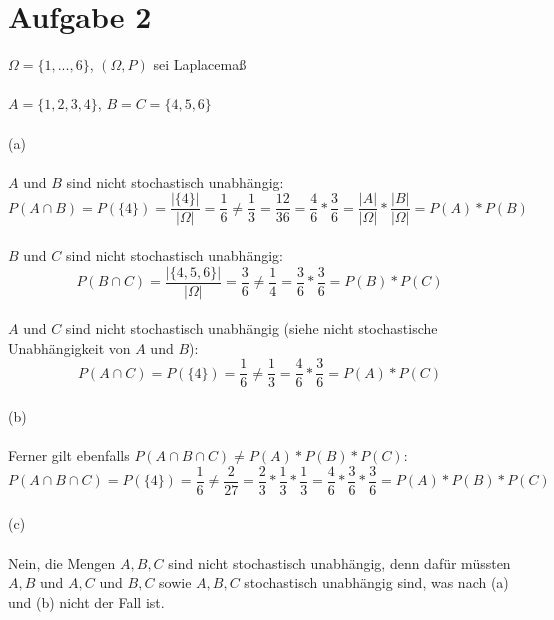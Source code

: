 \documentclass[10pt,a4paper]{article}
\begin{document}
	\newpage


	\section*{Aufgabe 2}
	
		$\Omega = \{1, ..., 6\}$,
		\tab $(\Omega, P)$ sei Laplacemaß
		\\
		\\
		$A = \{1,2,3,4\}$,
		\tab
		$B = C = \{4,5,6\}$
		\\
		\\
		(a)
		\\
		\\
		$A$ und $B$ sind nicht stochastisch unabhängig:
		\begin{displaymath}
		P(A \cap B) = P(\{4\}) = \frac{|\{4\}|}{|\Omega|}
		= \frac{1}{6}
		\neq
		\frac{1}{3}= \frac{12}{36} = \frac{4}{6} * \frac{3}{6}
		= \frac{|A|}{|\Omega|} * \frac{|B|}{|\Omega|} = P(A) * P(B)
		\end{displaymath}
		\\
		$B$ und $C$ sind nicht stochastisch unabhängig:
		\begin{displaymath}
		P(B \cap C) = \frac{|\{4,5,6\}|}{|\Omega|} = \frac{3}{6}
		\neq \frac{1}{4} = \frac{3}{6} * \frac{3}{6} = P(B) * P(C)
		\end{displaymath}
		\\
		$A$ und $C$ sind nicht stochastisch unabhängig (siehe
		nicht stochastische Unabhängigkeit von $A$ und $B$):
		\begin{displaymath}
		P(A \cap C) = P(\{4\}) = \frac{1}{6}
		\neq
		\frac{1}{3} = \frac{4}{6} * \frac{3}{6}
		= P(A) * P(C)
		\end{displaymath}
		\\
		(b)
		\\
		\\
		Ferner gilt ebenfalls $P(A \cap B \cap C) \neq P(A) * P(B) * P(C)$:
		\begin{displaymath}
		P(A \cap B \cap C)
		= P(\{4\}) = \frac{1}{6}
		\neq
		\frac{2}{27}
		= \frac{2}{3} * \frac{1}{3} * \frac{1}{3}
		= \frac{4}{6} * \frac{3}{6} * \frac{3}{6}
		= P(A) * P(B) * P(C)
		\end{displaymath}
		\\
		(c)
		\\
		\\
		Nein, die Mengen $A, B, C$ sind nicht stochastisch unabhängig, denn dafür müssten $A, B$ und $A, C$ und $B, C$ sowie $A, B, C$ stochastisch unabhängig sind, was nach (a) und (b) nicht der Fall ist.
		
		\begin{flushright}
			\text{$\Box$}
		\end{flushright}
		
\end{document}
